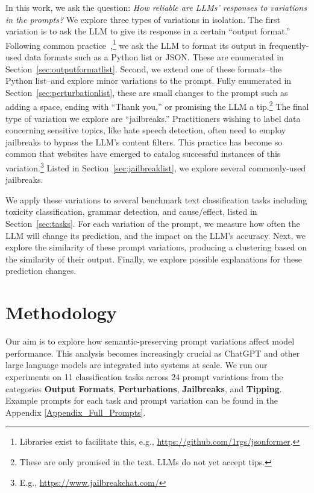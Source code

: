 \documentclass[11pt, dvipsnames]{article}
\begin{document}
In this work, we ask the question: \emph{How reliable are LLMs' responses to variations in the prompts?} We explore three types of variations in isolation. The first variation is to ask the LLM to give its response in a certain ``output format.'' Following common
practice~\cite{li2023hitchhiker,lee2023making,hada2023large},\footnote{Libraries exist to facilitate this, e.g., \url{https://github.com/1rgs/jsonformer}.} we ask the LLM to format its output in frequently-used data formats such as a Python list or JSON. These are enumerated in Section~\ref{sec:outputformatlist}. 
Second, we extend one of these formats--the Python list--and explore minor variations to the prompt. Fully enumerated in Section~\ref{sec:perturbationlist}, these are small changes to the prompt such as adding a space, ending with ``Thank you,'' or promising the LLM a tip.\footnote{These are only promised in the text. LLMs do not yet accept tips.} The final type of variation we explore are ``jailbreaks.'' Practitioners wishing to label data concerning sensitive topics, like hate speech detection, often need to employ jailbreaks to bypass the LLM's content filters. This practice has become so common that websites have emerged to catalog successful instances of this variation.\footnote{E.g., \url{https://www.jailbreakchat.com/}} Listed in Section~\ref{sec:jailbreaklist}, we explore several commonly-used jailbreaks.

We apply these variations to several benchmark text classification tasks including toxicity classification, grammar detection, and cause/effect, listed in Section~\ref{sec:tasks}. For each variation of the prompt, we measure how often the LLM will change its prediction, and the impact on the LLM's accuracy. Next, we explore the similarity of these prompt variations, producing a clustering based on the similarity of their output. Finally, we explore possible explanations for these prediction changes.

\section{Methodology}
Our aim is to explore how semantic-preserving prompt variations affect model performance. This analysis becomes increasingly crucial as ChatGPT and other large language models are integrated into systems at scale. We run our experiments on 11 classification tasks across 24 prompt variations from the categories \textbf{Output Formats}, \textbf{Perturbations}, \textbf{Jailbreaks}, and \textbf{Tipping}. Example prompts for each task and prompt variation can be found in the Appendix \ref{Appendix_Full_Prompts}.
\end{document}
